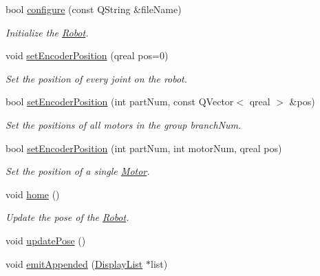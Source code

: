 \begin{DoxyCompactItemize}
bool \hyperlink{class_robot_model_1_1_robot_a9ca9887b212f3233d101d95854cf2c79}{configure} (const QString \&fileName)
\begin{DoxyCompactList}\small\item\em Initialize the \hyperlink{class_robot_model_1_1_robot}{Robot}. \item\end{DoxyCompactList}\item 
void \hyperlink{class_robot_model_1_1_robot_a72ff62b72e0e9d34d3ca0c241dec50d3}{setEncoderPosition} (qreal pos=0)
\begin{DoxyCompactList}\small\item\em Set the position of every joint on the robot. \item\end{DoxyCompactList}\item 
bool \hyperlink{class_robot_model_1_1_robot_ad68d3bd2d8edbca49704f8a5b01055a1}{setEncoderPosition} (int partNum, const QVector$<$ qreal $>$ \&pos)
\begin{DoxyCompactList}\small\item\em Set the positions of all motors in the group branchNum. \item\end{DoxyCompactList}\item 
bool \hyperlink{class_robot_model_1_1_robot_a08017bce09f838437534aec53d615ff6}{setEncoderPosition} (int partNum, int motorNum, qreal pos)
\begin{DoxyCompactList}\small\item\em Set the position of a single \hyperlink{class_robot_model_1_1_motor}{Motor}. \item\end{DoxyCompactList}\item 
void \hyperlink{class_robot_model_1_1_robot_a2fd7c2a0cd53593361f38f52de41d73c}{home} ()
\begin{DoxyCompactList}\small\item\em Update the pose of the \hyperlink{class_robot_model_1_1_robot}{Robot}. \item\end{DoxyCompactList}\item 
void \hyperlink{class_robot_model_1_1_robot_a7338994f0ab4baa6e5d08751272b63ca}{updatePose} ()
\item 
void \hyperlink{class_robot_model_1_1_robot_a4c006ead68b20137a28276920103667c}{emitAppended} (\hyperlink{class_robot_model_1_1_display_list}{DisplayList} $\ast$list)
\item 

\end{DoxyCompactItemize}
